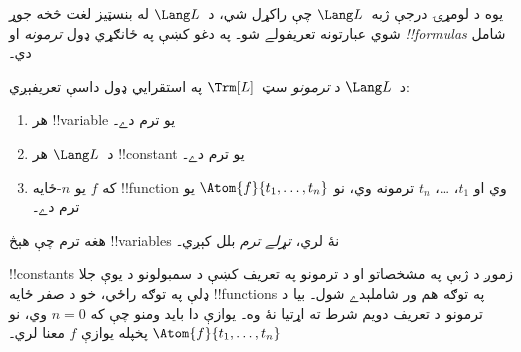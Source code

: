 \documentclass[../../../include/open-logic-section]{subfiles}
\begin{document}


يوه د لومړۍ درجې ژبه~$\Lang L$ چې راکړل شي، د~$\Lang L$ له بنسټيز
لغت څخه جوړ شوي عبارتونه تعريفولے شو۔ په دغو کښې په ځانګړي ډول
\emph{ترمونه} او \emph{!!{formula}s} شامل دي۔

\begin{defn}[ترمونه]
د~$\Lang L$ د \emph{ترمونو} سټ~$\Trm[L]$ په استقرايي ډول داسې
تعريفېږي:
\begin{enumerate}
\item هر !!{variable} يو ترم دے۔
\item د~$\Lang L$ هر !!{constant} يو ترم دے۔
\item که $f$ يو $n$-ځايه !!{function} وي او $t_1$، \dots، $t_n$
  ترمونه وي، نو $\Atom{f}{t_1, \ldots, t_n}$ يو ترم دے۔
\end{enumerate}
هغه ترم چې هېڅ !!{variable}s نۀ لري، \emph{تړلے ترم} بلل کېږي۔
\end{defn}

\begin{explain}
!!{constant}s زموږ د ژبې په مشخصاتو او د ترمونو په تعريف کښې د
سمبولونو د يوې جلا ډلې په توګه راځي، خو د صفر ځايه !!{function}s په
توګه هم ور شاملېدے شول۔ بيا د ترمونو د تعريف دويم شرط ته اړتيا نۀ
وه۔ يوازې دا بايد ومنو چې که $n = 0$ وي، نو
$\Atom{f}{t_1, \ldots, t_n}$ پخپله يوازې $f$ معنا لري۔
\end{explain}
\end{document}

